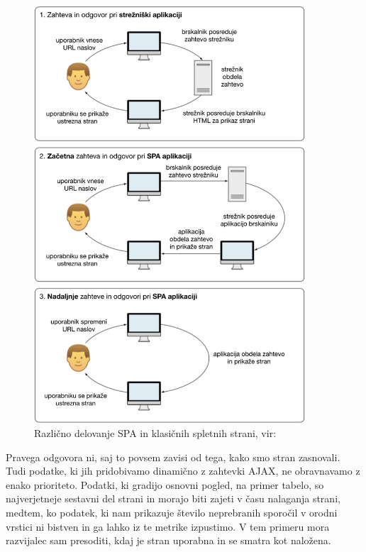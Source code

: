 \documentclass[a4paper, 12pt]{book}
\begin{document}
\begin{figure}[!htb]
	\begin{center}
		\includegraphics[width=0.9\textwidth]{Razlicni_nacini_obdelave_zahtev.png}
	\end{center}
	\caption{Različno delovanje SPA in klasičnih spletnih strani, vir: \cite{sp_skripta}}
	\label{img:diff_multipage_spa}
\end{figure}

Pravega odgovora ni, saj to povsem zavisi od tega, kako smo stran zasnovali. Tudi podatke, ki jih pridobivamo dinamično z zahtevki AJAX, ne obravnavamo z enako prioriteto. Podatki, ki gradijo osnovni pogled, na primer tabelo, so najverjetneje sestavni del strani in morajo biti zajeti v času nalaganja strani, medtem, ko podatek, ki nam prikazuje število neprebranih sporočil v orodni vrstici ni bistven in ga lahko iz te metrike izpustimo. V tem primeru mora razvijalec sam presoditi, kdaj je stran uporabna in se smatra kot naložena.
\end{document}
